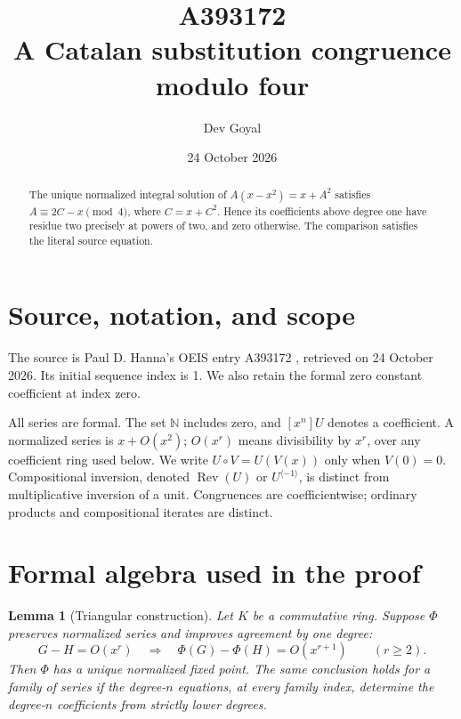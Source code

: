 \documentclass[11pt,a4paper]{article}
\title{A393172\\[4pt]\large A Catalan substitution congruence modulo four}
\author{Dev Goyal}
\date{24 October 2026}
\newtheorem{lemma}[theorem]{Lemma}
\theoremstyle{remark}
\newcommand{\N}{\mathbb N}
\newcommand{\Rev}{\operatorname{Rev}}
\newcommand{\rev}{^{\langle-1\rangle}}
\begin{document}
\maketitle
\begin{center}
\end{center}
\begin{abstract}
The unique normalized integral solution of $A(x-x^2)=x+A^2$ satisfies $A\equiv2C-x\pmod4$, where $C=x+C^2$. Hence its coefficients above degree one have residue two precisely at powers of two, and zero otherwise. The comparison satisfies the literal source equation.
\end{abstract}

\section{Source, notation, and scope}

The source is Paul D. Hanna's OEIS entry A393172 \cite{oeis172},
retrieved on 24 October 2026. Its initial sequence index is 1.
We also retain the formal zero constant coefficient at index zero.

All series are formal. The set $\N$ includes zero, and $[x^n]U$ denotes a
coefficient. A normalized series is $x+O(x^2)$; $O(x^r)$ means divisibility
by $x^r$, over any coefficient ring used below. We write $U\circ V=U(V(x))$
only when $V(0)=0$. Compositional inversion, denoted $\Rev(U)$ or $U\rev$,
is distinct from multiplicative inversion of a unit. Congruences are
coefficientwise; ordinary products and compositional iterates are distinct.

\section{Formal algebra used in the proof}

\begin{lemma}[Triangular construction]\label{lem:construction}
Let $K$ be a commutative ring. Suppose $\Phi$ preserves normalized series
and improves agreement by one degree:
\[
 G-H=O(x^r)\quad\Longrightarrow\quad
 \Phi(G)-\Phi(H)=O(x^{r+1})\qquad(r\ge2).
\]
Then $\Phi$ has a unique normalized fixed point. The same conclusion holds
for a family of series if the degree-$n$ equations, at every family index,
determine the degree-$n$ coefficients from strictly lower degrees.
\end{lemma}
\end{document}

